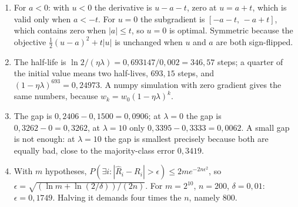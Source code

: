 \begin{enumerate}[label=\textbf{26.\arabic*}]
  \item For $a<0$: with $u<0$ the derivative is $u-a-t$, zero at $u=a+t$, which is valid
        only when $a<-t$. For $u=0$ the subgradient is $[-a-t,\,-a+t]$, which contains
        zero when $|a|\le t$, so $u=0$ is optimal. Symmetric because the objective
        $\frac12(u-a)^{2}+t|u|$ is unchanged when $u$ and $a$ are both sign-flipped.

  \item The half-life is $\ln2/(\eta\lambda)=0{,}693147/0{,}002=346{,}57$ steps;
        a quarter of the initial value means two half-lives, $693{,}15$ steps, and
        $(1-\eta\lambda)^{693}=0{,}24973$. A numpy simulation with zero gradient
        gives the same numbers, because $w_{k}=w_{0}(1-\eta\lambda)^{k}$.

  \item The gap is $0{,}2406-0{,}1500=0{,}0906$; at $\lambda=0$ the gap is
        $0{,}3262-0=0{,}3262$, at $\lambda=10$ only $0{,}3395-0{,}3333=0{,}0062$.
        A small gap is not enough: at $\lambda=10$ the gap is smallest precisely because
        both are equally bad, close to the majority-class error $0{,}3419$.

  \item With $m$ hypotheses, $P(\exists i:|\hat R_{i}-R_{i}|>\epsilon)\le
        2m e^{-2n\epsilon^{2}}$, so $\epsilon=\sqrt{(\ln m+\ln(2/\delta))/(2n)}$.
        For $m=2^{10}$, $n=200$, $\delta=0{,}01$: $\epsilon=0{,}1749$. Halving it
        demands four times the $n$, namely $800$.
\end{enumerate}

